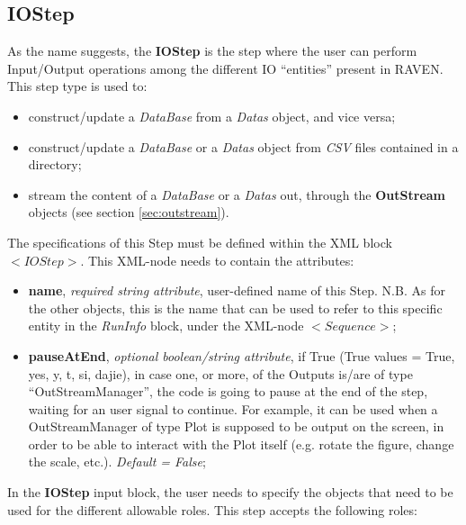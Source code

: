 \subsection{IOStep}
\label{subsec:stepIOStep}
As the name suggests, the  \textbf{IOStep} is the step where the user can perform Input/Output operations among the different IO ``entities'' present in RAVEN. This step type is used to: 
\begin{itemize}
 \item construct/update a \textit{DataBase} from a \textit{Datas} object, and vice versa;
 \item construct/update a \textit{DataBase} or a \textit{Datas} object from \textit{CSV} files contained in a directory;
 \item stream the content of a \textit{DataBase} or a \textit{Datas} out, through the \textbf{OutStream} objects (see section \ref{sec:outstream}).
\end{itemize}
 The specifications of this Step must be defined within the XML block $<IOStep>$. This XML-node needs to contain the attributes:
\vspace{-5mm}
\begin{itemize}
\itemsep0em
\item \textbf{name}, \textit{required string attribute}, user-defined name of this Step. N.B. As for the other objects, this is the name that can be used to refer to this specific entity in the \textit{RunInfo} block, under the XML-node $<Sequence>$;
\item \textbf{pauseAtEnd}, \textit{optional boolean/string attribute}, if True (True values = True, yes, y, t, si, dajie), in case one, or more, of the Outputs is/are of type ``OutStreamManager'', the code is going to pause at the end of the step, waiting for an user signal to continue. For example, it can be used when a OutStreamManager of type Plot is supposed to be output on the screen, in order to be able to interact with the Plot itself (e.g. rotate the figure, change the scale, etc.).  \textit{Default = False};
\end{itemize}
\vspace{-5mm}
In the \textbf{IOStep} input block, the user needs to specify the objects that need to be used for the different allowable roles. This step accepts the following roles:
